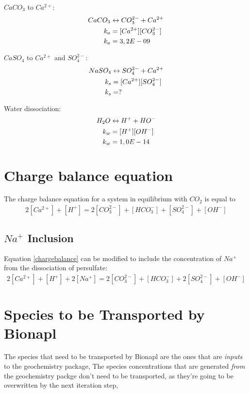 \documentclass[11pt,a4paper,twoside]{report}
\begin{document}
$CaCO_{3}$ to $Ca^{2+}$:
\begin{align}\label{caco3}
CaCO_{3} &\leftrightarrow  CO_{3}^{2-} + Ca^{2+} \\ \notag
k_{a}    &= [Ca^{2+}][CO_{3}^{2-}] \\ \notag
k_{a}    &= 3,2E-09
\end{align}

$CaSO_{4}$ to $Ca^{2+}$ and $SO_{4}^{2-}$:
\begin{align}\label{caso4}
NaSO_{4} &\leftrightarrow  SO_{4}^{2-} + Ca^{2+} \\ \notag
k_{s}    &= [Ca^{2+}][SO_{4}^{2-}] \\ \notag
k_{s}    &= ?
\end{align}

Water dissociation:
\begin{align}\label{h2o}
H_{2}O &\leftrightarrow  H^{+} + HO^{-} \\ \notag
k_{w}  &= [H^{+}][OH^{-}] \\ \notag
k_{w}  &= 1,0E-14
\end{align}


\section{Charge balance equation}
The charge balance equation for a system in equilibrium with $CO_{2}$ is equal to 
\begin{align}\label{chargebalance}
2[Ca^{2+}] + [H^{+}] = 2[CO_{3}^{2-}] + [HCO_{3}^{-}] + [SO_{4}^{2-}] + [OH^{-}]
\end{align}

\subsection{\texorpdfstring{$Na^{+}$}{Na} Inclusion}
Equation \eqref{chargebalance} can be modified to include the concentration of $Na^{+}$ from the dissociation of persulfate:
\begin{align}\label{chargebalancena}
2[Ca^{2+}] + [H^{+}] +2[Na^{+}]= 2[CO_{3}^{2-}] + [HCO_{3}^{-}] + 2[SO_{4}^{2-}] + [OH^{-}]
\end{align}

\section{Species to be Transported by Bionapl}
The species that need to be transported by Bionapl are the ones that are \textit{inputs} to the geochemistry package, The species concentrations that are generated \textit{from} the geochemistry packge don't need to be transported, as they're going to be overwritten by the next iteration step, 
\end{document}
